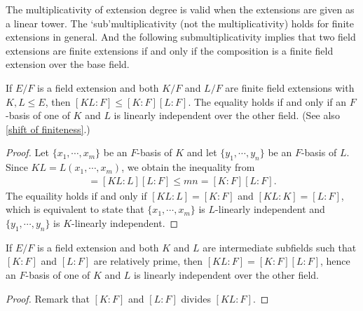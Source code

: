The multiplicativity of extension degree is valid when the extensions are given as a linear tower.
The `sub'multiplicativity (not the multiplicativity) holds for finite extensions in general.
And the following submultiplicativity implies that two field extensions are finite extensions if and only if the composition is a finite field extension over the base field.
\begin{prop}\label{submultiplicativity of field composition}
    If $E/F$ is a field extension and both $K/F$ and $L/F$ are finite field extensions with $K, L\leq E$, then $[KL: F]\leq[K: F][L: F]$.
    The equality holds if and only if an $F$-basis of one of $K$ and $L$ is linearly independent over the other field.
    (See also \cref{shift of finiteness}.)
\end{prop}
\begin{proof}
    Let $\{x_1, \cdots, x_m\}$ be an $F$-basis of $K$ and let $\{y_1, \cdots, y_n\}$ be an $F$-basis of $L$.
    Since $KL=L(x_1, \cdots, x_m)$, we obtain the inequality from
    \begin{align*}
        [KL:F]=[KL:L][L:F]\leq mn=[K:F][L:F].
    \end{align*}
    The equaility holds if and only if $[KL:L]=[K:F]$ and $[KL:K]=[L:F]$, which is equivalent to state that $\{x_1, \cdots, x_m\}$ is $L$-linearly independent and $\{y_1, \cdots, y_n\}$ is $K$-linearly independent.
\end{proof}
\begin{cor}
    If $E/F$ is a field extension and both $K$ and $L$ are intermediate subfields such that $[K:F]$ and $[L:F]$ are relatively prime, then $[KL:F]=[K:F][L:F]$, hence an $F$-basis of one of $K$ and $L$ is linearly independent over the other field.
\end{cor}
\begin{proof}
    Remark that $[K:F]$ and $[L:F]$ divides $[KL:F]$.
\end{proof}

